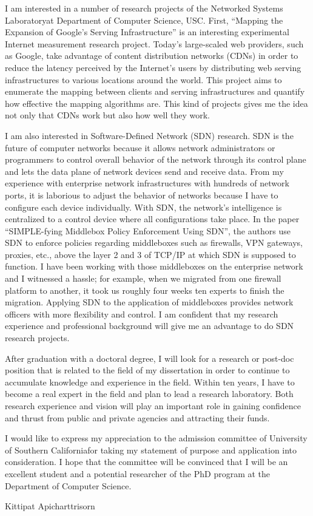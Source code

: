 \documentclass[a4paper,12pt]{report}
\newcommand{\university}{University of Southern California}
\newcommand{\department}{Department of Computer Science}
\newcommand{\uniabbre}{USC}
\newcommand{\labfirst}{Networked Systems Laboratory}
\begin{document}
\vspace{0.2cm}
I am interested in a number of research projects of the \labfirst \space at \department, \uniabbre. First, ``Mapping the Expansion of Google's Serving Infrastructure'' is an interesting experimental Internet measurement research project. Today's large-scaled web providers, such as Google, take advantage of content distribution networks (CDNs) in order to reduce the latency perceived by the Internet's users by distributing web serving infrastructures to various locations around the world. This project aims to enumerate the mapping between clients and serving infrastructures and quantify how effective the mapping algorithms are. This kind of projects gives me the idea not only that CDNs work but also how well they work. 

%
\vspace{0.2cm}
I am also interested in Software-Defined Network (SDN) research. SDN is the future of computer networks because it allows network administrators or programmers to control overall behavior of the network through its control plane and lets the data plane of network devices send and receive data. From my experience with enterprise network infrastructures with hundreds of network ports, it is laborious to adjust the behavior of networks because I have to configure each device individually. With SDN, the network's intelligence is centralized to a control device where all configurations take place. In the paper ``SIMPLE-fying Middlebox Policy Enforcement Using SDN'', the authors use SDN to enforce policies regarding middleboxes such as firewalls, VPN gateways, proxies, etc., above the layer 2 and 3 of TCP/IP at which SDN is supposed to function. I have been working with those middleboxes on the enterprise network and I witnessed a hassle; for example, when we migrated from one firewall platform to another, it took us roughly four weeks ten experts to finish the migration. Applying SDN to the application of middleboxes provides network officers with more flexibility and control. I am confident that my research experience and professional background will give me an advantage to do SDN research projects.

\vspace{0.2cm}
After graduation with a doctoral degree, I will look for a research or post-doc position that is related to the field of my dissertation in order to continue to accumulate knowledge and experience in the field. Within ten years, I have to become a real expert in the field and plan to lead a research laboratory. Both research experience and vision will play an important role in gaining confidence and thrust from public and private agencies and attracting their funds.

\vspace{0.2cm}
I would like to express my appreciation to the admission committee of \university \space for taking my statement of purpose and application into consideration. I hope that the committee will be convinced that I will be an excellent student and a potential researcher of the PhD program at the \department.

\vspace{1cm}
\raggedleft Kittipat Apicharttrisorn
\end{document}
